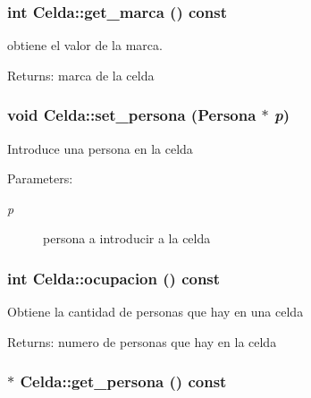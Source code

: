 \subsubsection{\setlength{\rightskip}{0pt plus 5cm}int Celda::get\_\-marca () const\hspace{0.3cm}{\tt  [inline]}}\label{classCelda_2dd0e57428817f6d4a59876660ce1111}


obtiene el valor de la marca. 

\begin{Desc}
\item[Returns:]marca de la celda \end{Desc}
\subsubsection{\setlength{\rightskip}{0pt plus 5cm}void Celda::set\_\-persona ({\bf Persona} $\ast$ {\em p})}\label{classCelda_29e79a26f399a6bcdd057f86a0c4867f}


Introduce una persona en la celda \begin{Desc}
\item[Parameters:]
\begin{description}
\item[{\em p}]persona a introducir a la celda \end{description}
\end{Desc}
\subsubsection{\setlength{\rightskip}{0pt plus 5cm}int Celda::ocupacion () const}\label{classCelda_9cae98c132d67911ad14c6dbebd6656a}


Obtiene la cantidad de personas que hay en una celda \begin{Desc}
\item[Returns:]numero de personas que hay en la celda \end{Desc}
\subsubsection{ $\ast$ Celda::get\_\-persona () const}\label{classCelda_dfd04055cf6de2c43d06e66d9cbd6ded}


